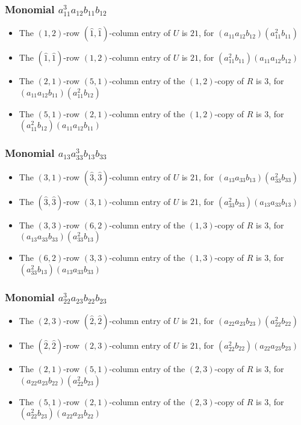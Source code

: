 \documentclass{article}
\begin{document}
\subsubsection{Monomial $ a_{11}^{3} a_{12} b_{11} b_{12} $}

\begin{itemize}
\item The $ \left(1, 2\right) $-row $ (\hat{1}, \hat{1}) $-column entry of $U$ is $ 21 $, for $( a_{11} a_{12} b_{12} )( a_{11}^{2} b_{11} )$ 
\item The $(\hat{1}, \hat{1})$-row $ \left(1, 2\right) $-column entry of $U$ is $ 21 $, for $( a_{11}^{2} b_{11} )( a_{11} a_{12} b_{12} )$ 
\item The $(2, 1)$-row $(5, 1)$-column entry of the $ \left(1, 2\right) $-copy of $R$ is $ 3 $, for $( a_{11} a_{12} b_{11} )( a_{11}^{2} b_{12} )$ 
\item The $(5, 1)$-row $(2, 1)$-column entry of the $ \left(1, 2\right) $-copy of $R$ is $ 3 $, for $( a_{11}^{2} b_{12} )( a_{11} a_{12} b_{11} )$ 
\end{itemize}
\subsubsection{Monomial $ a_{13} a_{33}^{3} b_{13} b_{33} $}

\begin{itemize}
\item The $ \left(3, 1\right) $-row $ (\hat{3}, \hat{3}) $-column entry of $U$ is $ 21 $, for $( a_{13} a_{33} b_{13} )( a_{33}^{2} b_{33} )$ 
\item The $(\hat{3}, \hat{3})$-row $ \left(3, 1\right) $-column entry of $U$ is $ 21 $, for $( a_{33}^{2} b_{33} )( a_{13} a_{33} b_{13} )$ 
\item The $(3, 3)$-row $(6, 2)$-column entry of the $ \left(1, 3\right) $-copy of $R$ is $ 3 $, for $( a_{13} a_{33} b_{33} )( a_{33}^{2} b_{13} )$ 
\item The $(6, 2)$-row $(3, 3)$-column entry of the $ \left(1, 3\right) $-copy of $R$ is $ 3 $, for $( a_{33}^{2} b_{13} )( a_{13} a_{33} b_{33} )$ 
\end{itemize}
\subsubsection{Monomial $ a_{22}^{3} a_{23} b_{22} b_{23} $}

\begin{itemize}
\item The $ \left(2, 3\right) $-row $ (\hat{2}, \hat{2}) $-column entry of $U$ is $ 21 $, for $( a_{22} a_{23} b_{23} )( a_{22}^{2} b_{22} )$ 
\item The $(\hat{2}, \hat{2})$-row $ \left(2, 3\right) $-column entry of $U$ is $ 21 $, for $( a_{22}^{2} b_{22} )( a_{22} a_{23} b_{23} )$ 
\item The $(2, 1)$-row $(5, 1)$-column entry of the $ \left(2, 3\right) $-copy of $R$ is $ 3 $, for $( a_{22} a_{23} b_{22} )( a_{22}^{2} b_{23} )$ 
\item The $(5, 1)$-row $(2, 1)$-column entry of the $ \left(2, 3\right) $-copy of $R$ is $ 3 $, for $( a_{22}^{2} b_{23} )( a_{22} a_{23} b_{22} )$ 
\end{itemize}
\end{document}
